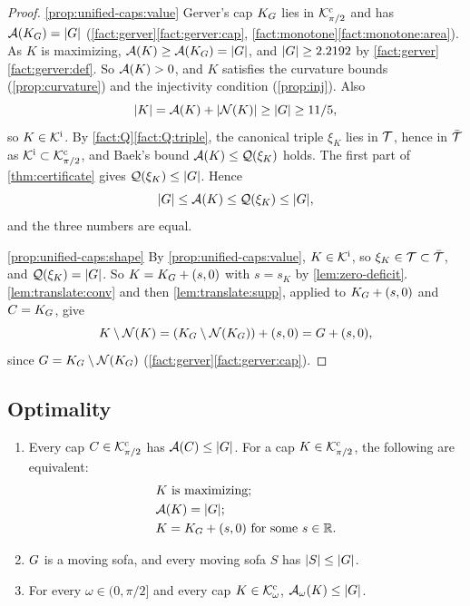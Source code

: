 \begin{proof}
\ref{prop:unified-caps:value} Gerver's cap $K_G$ lies in $\mathcal{K}^{\mathrm{c}}_{\pi/2}$ and has
$\mathcal{A}(K_G)=\lvert G\rvert$ (\cref{fact:gerver}\ref{fact:gerver:cap},
\cref{fact:monotone}\ref{fact:monotone:area}). As $K$ is maximizing,
$\mathcal{A}(K)\ge\mathcal{A}(K_G)=\lvert G\rvert$, and $\lvert G\rvert\ge2.2192$ by
\cref{fact:gerver}\ref{fact:gerver:def}. So $\mathcal{A}(K)>0$, and $K$ satisfies the
curvature bounds (\cref{prop:curvature}) and the injectivity condition
(\cref{prop:inj}). Also
\[
  \lvert K\rvert=\mathcal{A}(K)+\lvert \mathcal{N}(K)\rvert\ge\lvert G\rvert\ge11/5,
\]
so $K\in\mathcal{K}^{\mathrm{i}}$. By \cref{fact:Q}\ref{fact:Q:triple}, the canonical triple $\xi_K$
lies in $\mathcal{T}$, hence in $\bar{\mathcal{T}}$ as $\mathcal{K}^{\mathrm{i}}\subset\mathcal{K}^{\mathrm{c}}_{\pi/2}$, and Baek's bound
$\mathcal{A}(K)\le\mathcal{Q}(\xi_K)$ holds. The first part of \cref{thm:certificate} gives
$\mathcal{Q}(\xi_K)\le\lvert G\rvert$. Hence
\[
  \lvert G\rvert\le\mathcal{A}(K)\le\mathcal{Q}(\xi_K)\le\lvert G\rvert ,
\]
and the three numbers are equal.

\ref{prop:unified-caps:shape} By \ref{prop:unified-caps:value}, $K\in\mathcal{K}^{\mathrm{i}}$, so
$\xi_K\in\mathcal{T}\subset\bar{\mathcal{T}}$, and $\mathcal{Q}(\xi_K)=\lvert G\rvert$. So $K=K_G+(s,0)$ with
$s=s_K$ by \cref{lem:zero-deficit}.
\ref{lem:translate:conv} and then
\ref{lem:translate:supp}, applied to $K_G+(s,0)$ and $C=K_G$, give
\[
  K\setminus\mathcal{N}(K)=(K_G\setminus\mathcal{N}(K_G))+(s,0)=G+(s,0),
\]
since $G=K_G\setminus\mathcal{N}(K_G)$ (\cref{fact:gerver}\ref{fact:gerver:cap}).
\end{proof}

\subsection{Optimality}\label{sec:unified-optimality}

\begin{theorem}\label{thm:unified-optimality}
\begin{enumerate}[label=(\alph*)]
\item\label{thm:unified-optimality:right} Every cap $C\in\mathcal{K}^{\mathrm{c}}_{\pi/2}$ has
$\mathcal{A}(C)\le\lvert G\rvert$. For a cap $K\in\mathcal{K}^{\mathrm{c}}_{\pi/2}$, the following are equivalent:
\begin{align*}
  &K\text{ is maximizing};\\
  &\mathcal{A}(K)=\lvert G\rvert;\\
  &K=K_G+(s,0)\text{ for some }s\in\mathbb{R}.
\end{align*}
\item\label{thm:unified-optimality:sofa} $G$ is a moving sofa, and every
moving sofa $S$ has $\lvert S\rvert\le\lvert G\rvert$.
\item\label{thm:unified-optimality:caps} For every $\omega\in(0,\pi/2]$ and
every cap $K\in\mathcal{K}^{\mathrm{c}}_\omega$, $\mathcal{A}_\omega(K)\le\lvert G\rvert$.
\end{enumerate}
\end{theorem}

